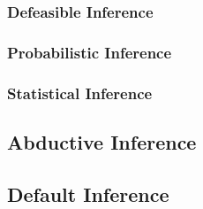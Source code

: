 \subsubsection{Defeasible Inference}\label{sec:defeasible_inference}

\subsubsection{Probabilistic Inference}\label{sec:probabilistic_inference}

\subsubsection{Statistical Inference}\label{sec:statistical_inference}



\subsection{Abductive Inference}\label{sec:abductive_inference}



\subsection{Default Inference}\label{sec:default_inference}
